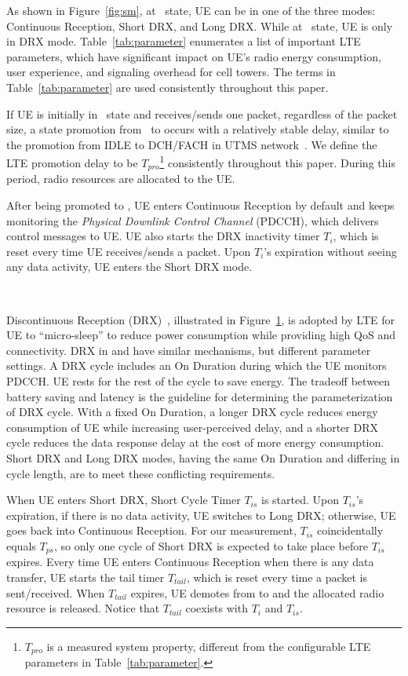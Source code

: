 As shown in Figure~\ref{fig:sm}, at \RC~state, UE can be in one of the three modes: Continuous Reception, Short DRX, and Long DRX. While at \RI~state, UE is only in DRX mode. Table~\ref{tab:parameter} enumerates a list of important LTE parameters, which have significant impact on UE's radio energy consumption, user experience, and signaling overhead for cell towers. The terms in Table~\ref{tab:parameter} are used consistently throughout this paper.

If UE is initially in \RI~state and receives/sends one packet, regardless of the packet size, a state promotion from \RI~to \RC occurs with a relatively stable delay, similar to the promotion from IDLE to DCH/FACH in UTMS network~\cite{imc.3g}. We define the LTE promotion delay to be $T_{pro}$\footnote{$T_{pro}$ is a measured system property, different from the configurable LTE parameters in Table~\ref{tab:parameter}.} consistently throughout this paper. During this period, radio resources are allocated to the UE.  

After being promoted to \RC, UE enters Continuous Reception by default and keeps monitoring the {\em Physical Downlink Control Channel} (PDCCH), which delivers control messages to UE. UE also starts the DRX inactivity timer $T_i$, which is reset every time UE receives/sends a packet. Upon $T_i$'s expiration without seeing any data activity, UE enters the Short DRX mode.

\begin{figure}[t]
\centering
{} \\
\label{fig:drx}
\end{figure}

Discontinuous Reception (DRX)~\cite{ts36.321, 4gbook}, illustrated in Figure~\ref{fig:drx}, is adopted by LTE for UE to ``micro-sleep'' to reduce power consumption while providing high QoS and connectivity. DRX in \RC and \RI have similar mechanisms, but different parameter settings. A DRX cycle includes an On Duration during which the UE monitors PDCCH. UE rests for the rest of the cycle to save energy. The tradeoff between battery saving and latency is the guideline for determining the parameterization of DRX cycle. With a fixed On Duration, a longer DRX cycle reduces energy consumption of UE while increasing user-perceived delay, and a shorter DRX cycle reduces the data response delay at the cost of more energy consumption. Short DRX and Long DRX modes, having the same On Duration and differing in cycle length, are to meet these conflicting requirements.

When UE enters Short DRX, Short Cycle Timer $T_{is}$ is started. Upon $T_{is}$'s expiration, if there is no data activity, UE switches to Long DRX; otherwise, UE goes back into Continuous Reception. For our measurement, $T_{is}$ coincidentally equals $T_{ps}$, so only one cycle of Short DRX is expected to take place before $T_{is}$ expires. Every time UE enters Continuous Reception when there is any data transfer, UE starts the tail timer $T_{tail}$, which is reset every time a packet is sent/received. When $T_{tail}$ expires, UE demotes from \RC to \RI and the allocated radio resource is released. Notice that $T_{tail}$ coexists with $T_{i}$ and $T_{is}$.

